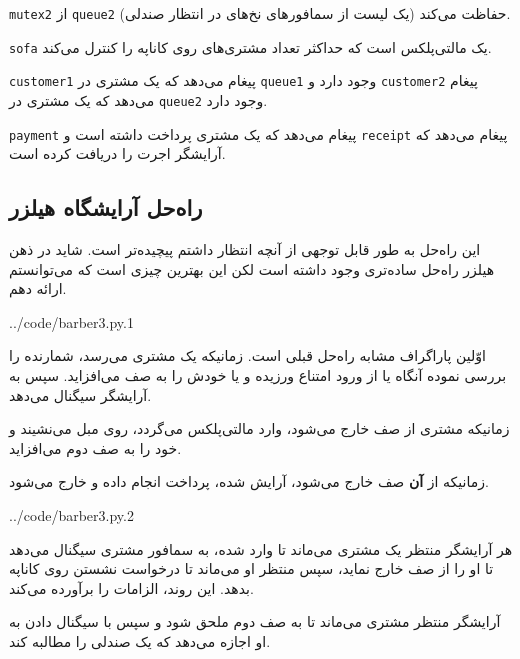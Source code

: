 \documentclass{book}
\newcommand{\clearemptydoublepage}{\newpage\cleardoublepage}
\begin{document}
    {\tt mutex2} 
    از {\tt queue2} (یک لیست از سمافورهای نخ‌های در انتظار صندلی) حفاظت می‌کند. 

    {\tt sofa} 
    یک مالتی‌پلکس است که حداکثر تعداد مشتری‌های روی کاناپه را کنترل می‌کند.

    {\tt customer1}
    پیغام می‌دهد که یک مشتری در  {\tt queue1} وجود دارد و {\tt customer2} پیغام می‌دهد که یک مشتری در  {\tt queue2} وجود دارد. 

     {\tt payment}
    پیغام می‌دهد که یک مشتری پرداخت داشته است و {\tt receipt} پیغام می‌دهد که آرایشگر اجرت را دریافت کرده است. 


\clearemptydoublepage
\subsection {راه‌حل آرایشگاه هیلزر}

    این راه‌حل به طور قابل توجهی از آنچه انتظار داشتم پیچیده‌تر است. شاید در ذهن هیلزر راه‌حل ساده‌تری وجود داشته است لکن 
    این بهترین چیزی است که می‌توانستم ارائه دهم. 

\begin{latin}

{../code/barber3.py.1}
\end{latin}

    اوّلین پاراگراف مشابه راه‌حل قبلی است. زمانیکه یک مشتری می‌رسد، شمارنده را بررسی نموده آنگاه یا از ورود امتناع ورزیده و یا خودش را به 
    صف می‌افزاید. سپس به آرایشگر سیگنال می‌دهد. 

    زمانیکه مشتری از صف خارج می‌شود، وارد مالتی‌پلکس می‌گردد، روی مبل می‌نشیند و خود را به صف دوم می‌افزاید. 

    زمانیکه از \textbf{آن} صف خارج می‌شود، آرایش شده، پرداخت انجام داده و خارج می‌شود.

\begin{latin}

{../code/barber3.py.2}
\end{latin}


    هر آرایشگر منتظر یک مشتری می‌ماند تا وارد شده، به سمافور مشتری سیگنال می‌دهد تا او را از صف خارج نماید، سپس منتظر او می‌ماند 
    تا درخواست نشستن روی کاناپه بدهد. این روند، الزامات  را برآورده می‌کند.

    آرایشگر منتظر مشتری می‌ماند تا به صف دوم ملحق شود و سپس با سیگنال دادن به او اجازه می‌دهد که یک صندلی را مطالبه کند. 
\end{document}
